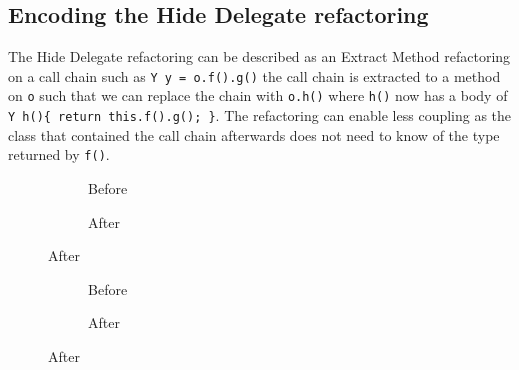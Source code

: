 \subsection{Encoding the Hide Delegate refactoring}\label{sec:hideDelegate}

The Hide Delegate refactoring can be described as an Extract Method refactoring on a call chain such as \lstinline[style=smallJava]|Y y = o.f().g()|
the call chain is extracted to a method on \lstinline[style=smallJava]|o| such that we can replace the chain with \lstinline[style=smallJava]|o.h()|
where \lstinline[style=smallJava]|h()| now has a body of \lstinline[style=smallJava]|Y h(){ return this.f().g(); }|.
The refactoring can enable less
coupling as the class that contained the call chain afterwards does not need to know of the type returned by \lstinline[style=smallJava]|f()|.


\begin{figure}
  \centering
  \begin{subfigure}{.4\linewidth}
    
    \caption{Before}
  \end{subfigure}\hspace{1cm}
  \begin{subfigure}{.4\linewidth}
    
    \caption{After}
  \end{subfigure}
\label{lst:HideDelegate-nofields-refinity}
\end{figure}

\begin{figure}
  \centering
  \begin{subfigure}{.4\linewidth}
    
    \caption{Before}
  \end{subfigure}\hspace{1cm}
  \begin{subfigure}{.4\linewidth}
    
    \caption{After}
  \end{subfigure}
\label{lst:HideDelegate-nofields-classes-refinity}
\end{figure}


